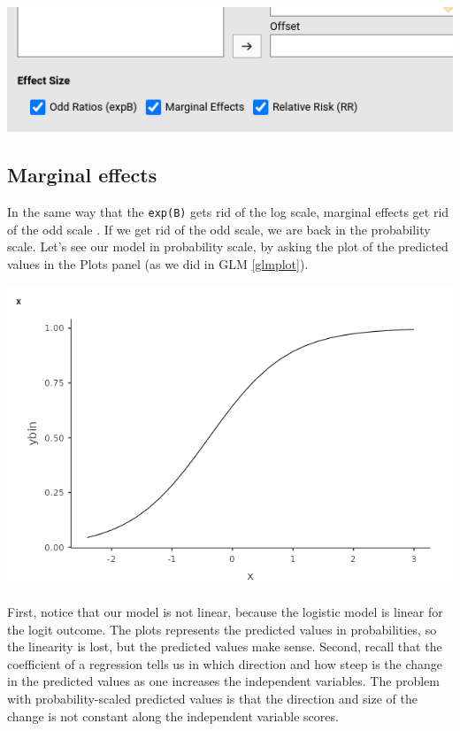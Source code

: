 \documentclass[
]{book}
\begin{document}
\includegraphics{bookletpics/3_logistic_input3.png}

\hypertarget{logisticcontmarginal}{%
\subsection{Marginal effects}\label{logisticcontmarginal}}

In the same way that the \texttt{exp(B)} gets rid of the log scale, marginal effects get rid of the odd scale \citep{agresti2018simple}. If we get rid of the odd scale, we are back in the probability scale. Let's see our model in probability scale, by asking the plot of the predicted values in the {Plots} panel (as we did in GLM \ref{glmplot}).

\includegraphics{bookletpics/3_logistic_plot2.png}

First, notice that our model is not linear, because the logistic model is linear for the logit outcome. The plots represents the predicted values in probabilities, so the linearity is lost, but the predicted values make sense. Second, recall that the coefficient of a regression tells us in which direction and how steep is the change in the predicted values as one increases the independent variables. The problem with probability-scaled predicted values is that the direction and size of the change is not constant along the independent variable scores.
\end{document}
